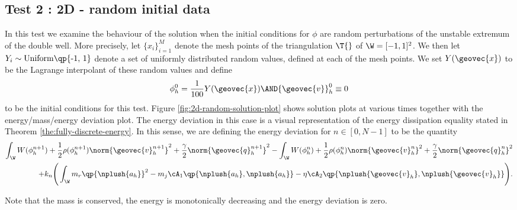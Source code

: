 \documentclass[final]{amsart}
\numberwithin{equation}{section}
\begin{document}
\subsection{Test 2 : 2D - random initial data}
\label{sec:2d-random}

In this test we examine the behaviour of the solution when the initial
conditions for $\phi$ are random perturbations of the unstable extremum
of the double well. More precisely, let $\{ x_i \}_{i = 1}^M$ denote
the mesh points of the triangulation $\T{}$ of $\W = [-1,1]^2$. We then let $Y_{i} \sim
\text{Uniform\qp{-1, 1}}$ denote a set of uniformly distributed random
values, defined at each of the mesh points. We set $Y({\geovec{x}})$ to be the
Lagrange interpolant of these random values and define
\begin{gather}
  \label{eq:1d-random-ics}
  \phi_h^0 = \frac{1}{100} Y({\geovec{x}}) \AND  {\geovec{v}}_h^0 \equiv 0
\end{gather}
to be the initial conditions for this test.  Figure
\ref{fig:2d-random-solution-plot} shows solution plots at various
times together with the energy/mass/energy deviation plot. The energy
deviation in this case is a visual representation of the energy
dissipation equality stated in Theorem
\ref{the:fully-discrete-energy}. In this sense, we are defining the
energy deviation for $n\in [0,N-1]$ to be the quantity
\begin{equation}
  \label{eq:energy-dev}
  \begin{split}
    \int_\W W(\phi_h^{n+1}) + \frac{1}{2} \rho(\phi_h^{n+1})\norm{{\geovec{v}}_h^{n+1}}^2 + \frac{\gamma}{2} \norm{{\geovec{q}}_h^{n+1}}^2 -
    \int_\W W(\phi_h^{n}) + \frac{1}{2} \rho(\phi_h^{n})\norm{{\geovec{v}}_h^{n}}^2 + \frac{\gamma}{2} \norm{{\geovec{q}}_h^{n}}^2 
    \\
    + k_n
    \Bigg(\int_\W m_r \qp{\nplush{a_h}}^2 - m_j \cA_1\qp{\nplush{a_h},
      \nplush{a_h}} - \eta \cA_2\qp{\nplush{{\geovec{v}}_h}, \nplush{{\geovec{v}}_h}} \Bigg).
  \end{split}
\end{equation}

Note that the mass is conserved, the energy is monotonically
decreasing and the energy deviation is zero.
\end{document}
